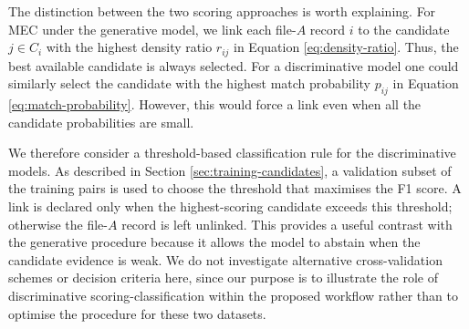 The distinction between the two scoring approaches is worth explaining. For MEC
under the generative model, we link each file-$A$ record $i$ to the candidate
$j\in C_i$ with the highest density ratio $r_{ij}$ in Equation
\eqref{eq:density-ratio}. Thus, the best available candidate is always selected.
For a discriminative model one could similarly select the candidate with the
highest match probability $p_{ij}$ in Equation \eqref{eq:match-probability}.
However, this would force a link even when all the candidate probabilities are
small.

We therefore consider a threshold-based classification rule for the discriminative
models. As described in Section \ref{sec:training-candidates}, a validation subset
of the training pairs is used to choose the threshold that maximises the F1 score.
A link is declared only when the highest-scoring candidate exceeds this threshold;
otherwise the file-$A$ record is left unlinked. This provides a useful contrast
with the generative procedure because it allows the model to abstain when the
candidate evidence is weak. We do not investigate alternative cross-validation
schemes or decision criteria here, since our purpose is to illustrate the role of
discriminative scoring-classification within the proposed workflow rather than to
optimise the procedure for these two datasets.

